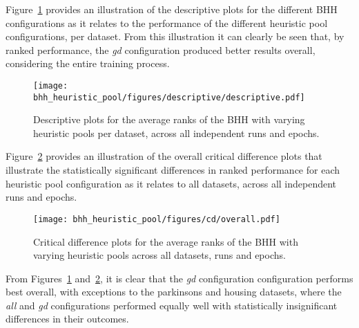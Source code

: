 Figure~\ref{fig:results:heuristic_pool:descriptive:descriptive} provides an illustration of the descriptive plots for the different \acs{BHH} configurations as it relates to the performance of the different heuristic pool configurations, per dataset. From this illustration it can clearly be seen that, by ranked performance, the \textit{gd} configuration produced better results overall, considering the entire training process.

\begin{figure}[htb]
	\centering
	\texttt{[image: bhh\_heuristic\_pool/figures/descriptive/descriptive.pdf]}
	\caption{Descriptive plots for the average ranks of the \acs{BHH} with varying heuristic pools per dataset, across all independent runs and epochs.}
	\label{fig:results:heuristic_pool:descriptive:descriptive}
\end{figure}

Figure~\ref{fig:results:heuristic_pool:descriptive:cd} provides an illustration of the overall critical difference plots that illustrate the statistically significant differences in ranked performance for each heuristic pool configuration as it relates to all datasets, across all independent runs and epochs.

\begin{figure}[htb]
	\centering
	\texttt{[image: bhh\_heuristic\_pool/figures/cd/overall.pdf]}
	\caption{Critical difference plots for the average ranks of the \acs{BHH} with varying heuristic pools across all datasets, runs and epochs.}
	\label{fig:results:heuristic_pool:descriptive:cd}
\end{figure}

From Figures~\ref{fig:results:heuristic_pool:descriptive:descriptive} and~\ref{fig:results:heuristic_pool:descriptive:cd}, it is clear that the \textit{gd} configuration configuration performs best overall, with exceptions to the parkinsons and housing datasets, where the \textit{all} and \textit{gd} configurations performed equally well with statistically insignificant differences in their outcomes.

